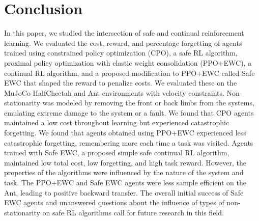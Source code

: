 \section{Conclusion} \label{sec:conclusion}

In this paper, we studied the intersection of safe and continual reinforcement learning. We evaluated the cost, reward, and percentage forgetting of agents trained using constrained policy optimization (CPO), a safe RL algorithm, proximal policy optimization with elastic weight consolidation (PPO+EWC), a continual RL algorithm, and a proposed modification to PPO+EWC called Safe EWC that shaped the reward to penalize costs. We evaluated these on the MuJoCo HalfCheetah and Ant environments with velocity constraints. Non-stationarity was modeled by removing the front or back limbs from the systems, emulating extreme damage to the system or a fault. We found that CPO agents maintained a low cost throughout learning but experienced catastrophic forgetting. We found that agents obtained using PPO+EWC experienced less catastrophic forgetting, remembering more each time a task was visited. Agents trained with Safe EWC, a proposed simple safe continual RL algorithm, maintained low total cost, low forgetting, and high task reward. However, the properties of the algorithms were influenced by the nature of the system and task. The PPO+EWC and Safe EWC agents were less sample efficient on the Ant, leading to positive backward transfer. The overall initial success of Safe EWC agents and unanswered questions about the influence of types of non-stationarity on safe RL algorithms call for future research in this field.